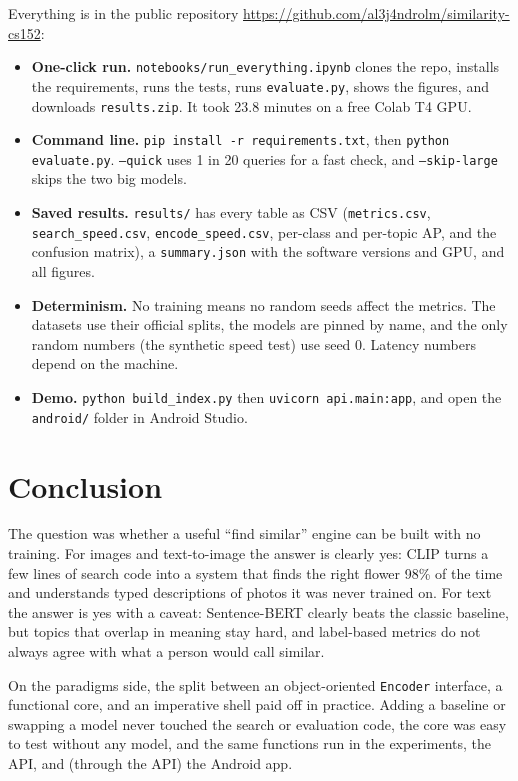 \documentclass{article}
\begin{document}
Everything is in the public repository \url{https://github.com/al3j4ndrolm/similarity-cs152}:
\begin{itemize}
  \item \textbf{One-click run.} \texttt{notebooks/run\_everything.ipynb} clones the repo, installs the requirements, runs the tests, runs \texttt{evaluate.\allowbreak py}, shows the figures, and downloads \texttt{results.\allowbreak zip}. It took 23.8 minutes on a free Colab T4 GPU.
  \item \textbf{Command line.} \texttt{pip install -r requirements.txt}, then \texttt{python evaluate.py}. \texttt{--quick} uses 1 in 20 queries for a fast check, and \texttt{--skip-large} skips the two big models.
  \item \textbf{Saved results.} \texttt{results/} has every table as CSV (\texttt{metrics.\allowbreak csv}, \texttt{search\_speed.csv}, \texttt{encode\_speed.csv}, per-class and per-topic AP, and the confusion matrix), a \texttt{summary.\allowbreak json} with the software versions and GPU, and all figures.
  \item \textbf{Determinism.} No training means no random seeds affect the metrics. The datasets use their official splits, the models are pinned by name, and the only random numbers (the synthetic speed test) use seed 0. Latency numbers depend on the machine.
  \item \textbf{Demo.} \texttt{python build\_index.py} then \texttt{uvicorn api.main:app}, and open the \texttt{android/} folder in Android Studio.
\end{itemize}

\section{Conclusion}

The question was whether a useful ``find similar'' engine can be built with no training. For images and text-to-image the answer is clearly yes: CLIP turns a few lines of search code into a system that finds the right flower 98\% of the time and understands typed descriptions of photos it was never trained on. For text the answer is yes with a caveat: Sentence-BERT clearly beats the classic baseline, but topics that overlap in meaning stay hard, and label-based metrics do not always agree with what a person would call similar.

On the paradigms side, the split between an object-oriented \texttt{Encoder} interface, a functional core, and an imperative shell paid off in practice. Adding a baseline or swapping a model never touched the search or evaluation code, the core was easy to test without any model, and the same functions run in the experiments, the API, and (through the API) the Android app.
\end{document}
